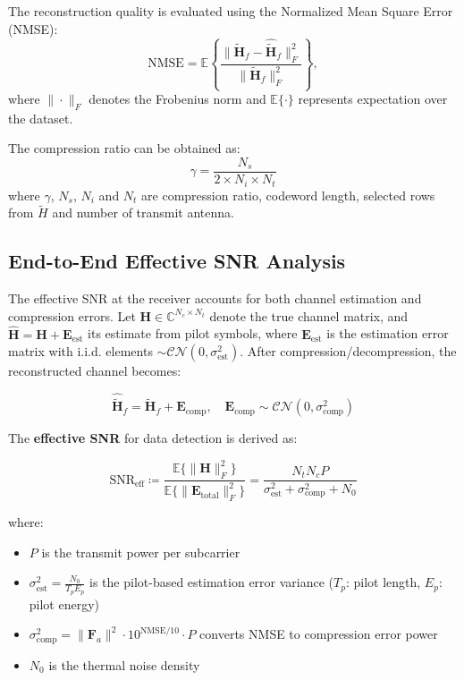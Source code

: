 \documentclass[lettersize,journal]{IEEEtran}
\begin{document}
The reconstruction quality is evaluated using the Normalized Mean Square Error (NMSE):
\[
\text{NMSE} = \mathbb{E}\left\{\frac{\|\tilde{\mathbf{H}}_f - \hat{\tilde{\mathbf{H}}}_f\|_F^2}{\|\tilde{\mathbf{H}}_f\|_F^2}\right\},
\]
where $\|\cdot\|_F$ denotes the Frobenius norm and $\mathbb{E}\{\cdot\}$ represents expectation over the dataset.

The compression ratio can be obtained as:
\[
\gamma = \frac{N_{s}}{2\times N_{i}\times N_{t}}  
\]
where $\gamma$, $N_{s}$, $N_{i}$ and $N_{t}$ are compression ratio, codeword length, selected rows from $\tilde{H}$ and number of transmit antenna.

\subsection{End-to-End Effective SNR Analysis}
The effective SNR at the receiver accounts for both channel estimation and compression errors. Let $\mathbf{H} \in \mathbb{C}^{N_c \times N_t}$ denote the true channel matrix, and $\hat{\mathbf{H}} = \mathbf{H} + \mathbf{E}_{\text{est}}$ its estimate from pilot symbols, where $\mathbf{E}_{\text{est}}$ is the estimation error matrix with i.i.d. elements $\sim \mathcal{CN}(0,\sigma_{\text{est}}^2)$. After compression/decompression, the reconstructed channel becomes:

\begin{equation}
\hat{\tilde{\mathbf{H}}}_f = \tilde{\mathbf{H}}_f + \mathbf{E}_{\text{comp}}, \quad \mathbf{E}_{\text{comp}} \sim \mathcal{CN}(0,\sigma_{\text{comp}}^2)
\end{equation}

The \textbf{effective SNR} for data detection is derived as:

\begin{equation}
\text{SNR}_{\text{eff}} \coloneqq \frac{\mathbb{E}\{\|\mathbf{H}\|_F^2\}}{\mathbb{E}\{\|\mathbf{E}_{\text{total}}\|_F^2\}} = \frac{N_t N_c P}{\sigma_{\text{est}}^2 + \sigma_{\text{comp}}^2 + N_0}
\end{equation}

\noindent where:
\begin{itemize}
\item $P$ is the transmit power per subcarrier
\item $\sigma_{\text{est}}^2 = \frac{N_0}{T_p E_p}$ is the pilot-based estimation error variance ($T_p$: pilot length, $E_p$: pilot energy)
\item $\sigma_{\text{comp}}^2 = \|\mathbf{F}_a\|^2 \cdot 10^{\text{NMSE}/10} \cdot P$ converts NMSE to compression error power
\item $N_0$ is the thermal noise density
\end{itemize}
\end{document}
